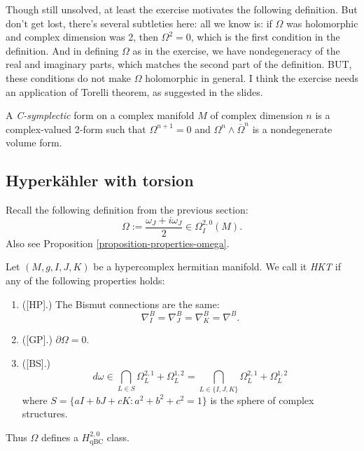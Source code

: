 \noindent
Though still unsolved,
at least the exercise motivates
the following definition.
But don't get lost, there's several
subtleties here: all we know is: if $\Omega$
was holomorphic and complex dimension
was 2, then $\Omega^2 = 0$, which is 
the first condition in the definition.
And in defining $\Omega$ as in the exercise,
we have nondegeneracy of the real and
imaginary parts, which matches
the second part of the definition.
BUT, these conditions do not make $\Omega$
holomorphic in general.
I think the exercise needs an application
of Torelli theorem, as suggested in the
slides.

\begin{definition}
\label{definition-c-symplectic}
A {\it C-symplectic} form on a complex
manifold $M$ of complex dimension $n$
is a complex-valued 2-form such that
$\Omega^{n+1} =0$
and $\Omega^n \wedge \overline{\Omega}^n$
is a nondegenerate volume form.
\end{definition}


\subsection{Hyperkähler with torsion}
\label{subsection-hkt}

\noindent
Recall the following definition from the
previous section:
$$
\Omega:=\frac{\omega_J+i \omega_J}{2}
\in \Omega^{2,0}_I(M).
$$
Also see
Proposition
\ref{proposition-properties-omega}.

\begin{definition}
\label{definition-hkt}
Let $(M,g,I,J,K)$ be a hypercomplex
hermitian manifold. We call it
{\it HKT} if any of the following
properties holds:
\begin{enumerate}
\item ([HP].) The Bismut connections
are the same:
$$
\nabla_I^B=\nabla_J^B=\nabla_K^B=\nabla^B.
$$

\item ([GP].) $\partial \Omega=0$.

\item ([BS].)
$$
d\omega \in
\bigcap_{L \in S}
\Omega_L^{2,1}+\Omega_L^{1,2}
=
\bigcap_{L \in \{I,J,K\}}
\Omega^{2,1}_L
+
\Omega^{1,2}_L
$$
where $S=\{a I+b J+ c K:a^2+b^2+c^2=1\}$
is the sphere of complex structures.
\end{enumerate}
\end{definition}

\noindent
Thus $\Omega$ defines a
$H^{2,0}_{\operatorname{qBC}}$ class.


